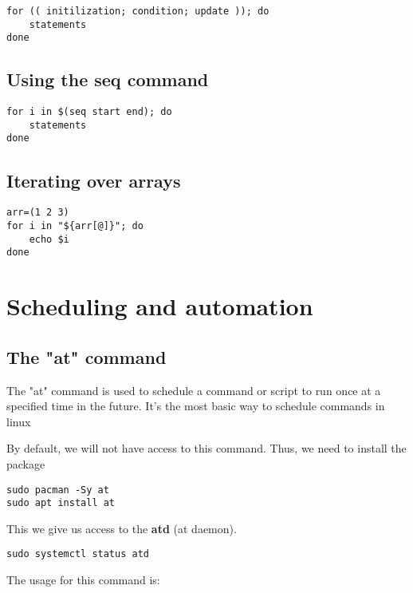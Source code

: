 \documentclass{report}
\begin{document}
    \begin{verbatim}
for (( initilization; condition; update )); do 
    statements
done
    \end{verbatim}
    \bigbreak \noindent
    
    \bigbreak \noindent 
    \subsection{Using the seq command}
    \smallbreak \noindent
    
    \begin{verbatim}
for i in $(seq start end); do
    statements
done
    \end{verbatim}
    \bigbreak \noindent
    

    \bigbreak \noindent 
    \subsection{Iterating over arrays}
    \smallbreak \noindent
    
    \begin{verbatim}
arr=(1 2 3)
for i in "${arr[@]}"; do
    echo $i
done
    \end{verbatim}
    \bigbreak \noindent
    

    \pagebreak \bigbreak \noindent 
    \section{\LARGE Scheduling and automation}
    \bigbreak \noindent 
    \subsection{The "at" command}
    \bigbreak \noindent 
    \begin{concept}
        The "at" command is used to schedule a command or script to run once at a specified time in the future. It's the most basic way to schedule commands in linux
    \end{concept}
    \bigbreak \noindent 
    By default, we will not have access to this command. Thus, we need to install the package
    \bigbreak \noindent 
    \begin{verbatim}
sudo pacman -Sy at
sudo apt install at
    \end{verbatim}
    \bigbreak \noindent 
    This we give us access to the \textbf{atd} (at daemon).
    \bigbreak \noindent 
    \begin{verbatim}
sudo systemctl status atd  
    \end{verbatim}
    \bigbreak \noindent 
    The usage for this command is:
    
\end{document}
